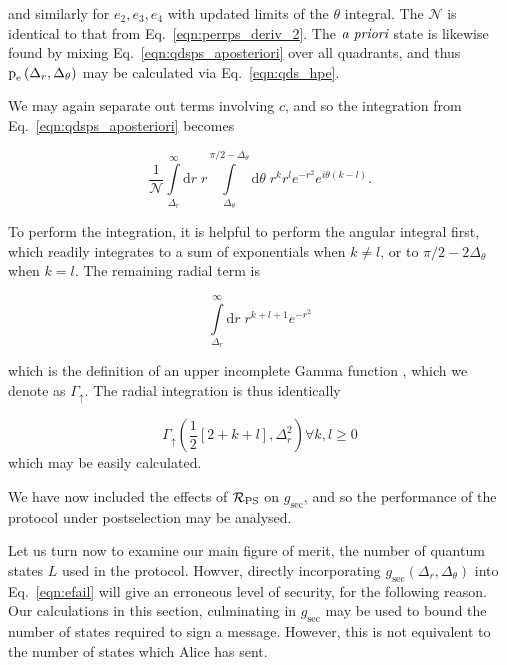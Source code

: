 \noindent and similarly for $e_2, e_3, e_4$ with updated limits of the $\theta$ integral. The $\mathcal{N}$ is identical to that from Eq.~\ref{eqn:perrps_deriv_2}. The $\emph{a priori}$ state is likewise found by mixing Eq.~\ref{eqn:qdsps_aposteriori} over all quadrants, and thus $\text{p}_{\text{e}}\left(\Delta_r, \Delta_\theta\right)$ may be calculated via Eq.~\ref{eqn:qds_hpe}. 

We may again separate out terms involving $c$, and so the integration from Eq.~\ref{eqn:qdsps_aposteriori} becomes

\begin{equation}
\frac{1}{\mathcal{N}} \int\limits_{\Delta_r}^{\infty} \mathrm{d}r \; r \int\limits_{\Delta_\theta}^{\pi/2 - \Delta_\theta} \mathrm{d}\theta \; r^k r^l e^{-r^2} e^{i \theta \left(k - l\right)}.
\end{equation}

\noindent To perform the integration, it is helpful to perform the angular integral first, which readily integrates to a sum of exponentials when $k \ne l$, or to $\pi/2 - 2\Delta_\theta$ when $k=l$. The remaining radial term is

\begin{equation}
\int\limits_{\Delta_r}^\infty \mathrm{d}r \; r^{k + l + 1} e^{-r^2}
\end{equation}

\noindent which is the definition of an upper incomplete Gamma function , which we denote as $\Gamma_\uparrow$. The radial integration is thus identically

\begin{equation}
\Gamma_{\uparrow}\left(\frac{1}{2}\left[2 + k + l\right], \Delta_r^2\right)  \forall k, l \ge 0
\end{equation}
which may be easily calculated.

We have now included the effects of $\mathcal{R}_{\text{PS}}$ on $g_{\text{sec}}$, and so the performance of the protocol under postselection may be analysed.


Let us turn now to examine our main figure of merit, the number of quantum states $L$ used in the protocol. Howver, directly incorporating $g_{\text{sec}}\left(\Delta_r, \Delta_\theta\right)$ into Eq.~\ref{eqn:efail} will give an erroneous level of security, for the following reason. Our calculations in this section, culminating in $g_{\text{sec}}$ may be used to bound the number of states required to sign a message. However, this is not equivalent to the number of states which Alice has sent. 

